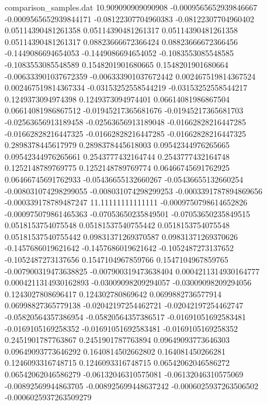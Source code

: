 \begin{filecontents}{comparison_samples.dat}
10.909090909090908  -0.0009565652939846667  -0.0009565652939844171  -0.08122307704960383   -0.08122307704960402   0.05114390481261358    0.05114390481261317    0.05114390481261358    0.05114390481261317    0.08823666672366424    0.08823666672366456    -0.1449086694654053     -0.1449086694654052     -0.1083553085548585    -0.1083553085548589    0.1548201901680665      0.1548201901680664      -0.006333901037672359   -0.006333901037672442   0.002467519814367524    0.002467519814367334    -0.03153252558544219    -0.03153252558544217    0.1249373094974398      0.1249373094974401      0.06614081986867504     0.06614081986867512     -0.01945217365681676   -0.01945217365681703   -0.02563656913189458   -0.02563656913189048   -0.01662828216447285    -0.01662828216447325    -0.01662828216447285    -0.01662828216447325    0.2898378445617979     0.2898378445618003     0.09542344976265665     0.09542344976265661     0.2543777432164744     0.2543777432164748     0.1252148789769775      0.1252148789769774      0.06466745691762925     0.06466745691762933     -0.05436655132660267   -0.05436655132660254   -0.008031074298299055  -0.008031074298299253  -0.0003391787894869656  -0.000339178789487247 
11.11111111111111   -0.0009750798614652826  -0.000975079861465363   -0.07053650235849501   -0.07053650235849515   0.0518153754075548     0.05181537540755442    0.0518153754075548     0.05181537540755442    0.09831371269370587    0.09831371269370626    -0.1457686019621642     -0.1457686019621642     -0.1052487273137652    -0.1052487273137656    0.1547104967859766      0.1547104967859765      -0.007900319473638825   -0.007900319473638404   0.0004211314930164777   0.0004211314930162893   -0.03009098209294057    -0.03009098209294056    0.1243027808696417      0.124302780869642       0.0699882736577914      0.06998827365779138     -0.02042197254462721   -0.02042197254462747   -0.05820564357386954   -0.05820564357386517   -0.01691051692583481    -0.0169105169258352     -0.01691051692583481    -0.0169105169258352     0.2451901787763867     0.2451901787763894     0.09649093773646303     0.09649093773646292     0.1640814502662802     0.164081450266281      0.1246093316748715      0.1246093316748715      0.06542062046586272     0.06542062046586279     -0.06132046310575081   -0.06132046310575069   -0.00892569944863705   -0.008925699448637242  -0.0006025937263506502  -0.0006025937263509279

\end{filecontents}
